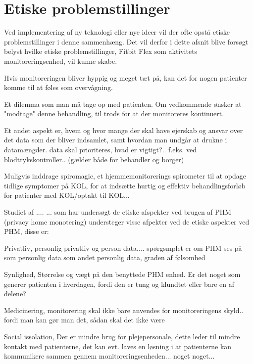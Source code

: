 \section{Etiske problemstillinger}

Ved implementering af ny teknologi eller nye ideer vil der ofte opstå etiske problemstillinger i denne sammenhæng. Det vil derfor i dette afsnit blive forsøgt belyst hvilke etiske problemstillinger, Fitbit Flex som aktivitets monitoreringsenhed, vil kunne skabe.

Hvis monitoreringen bliver hyppig og meget tæt på, kan det for nogen patienter komme til at føles som overvågning.

Et dilemma som man må tage op med patienten. Om vedkommende ønsker at "modtage" denne behandling, til trods for at der monitoreres kontinuert. 

Et andet aspekt er, hvem og hvor mange der skal have ejerskab og ansvar over det data som der bliver indsamlet, samt hvordan man undgår at drukne i datamængder. data skal prioriteres, hvad er vigtigt?.. f.eks. ved blodtrykskontroller.. (gælder både for behandler og borger)

Muligvis inddrage spiromagic, et hjemmemonitorerings spirometer til at opdage tidlige symptomer på KOL, for at indsætte hurtig og effektiv behandlingsforløb for patienter med KOL/optakt til KOL...

\citep{patienthome2015}


Studiet af .... ... som har undersøgt de etiske afspekter ved brugen af PHM (privacy home monotering)  understeger visse afpekter ved de etiske aspekter ved PHM, disse er:

Privatliv,
personlig privatliv og person data.... spørgsmplet er om PHM ses på som personlig data som andet personlig data, graden af følsomhed

Synlighed, 
Størrelse og vægt på den benyttede PHM enhed. Er det noget som generer patienten i hverdagen, fordi den er tung og klundtet eller bare en af delene? 

Medicinering, 
monitorering skal ikke bare anvendes for monitoreringens skyld.. fordi man kan gør man det, sådan skal det ikke være

Social issolation, 
Der er mindre brug for plejepersonale, dette leder til mindre kontakt med patienterne, det kan evt. laves en løsning i at patienterne kan kommunikere sammen gennem monitoreringsenheden... noget noget...

